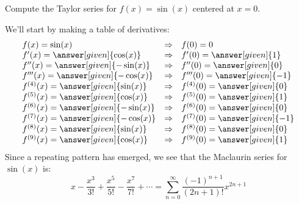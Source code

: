 \documentclass{ximera}
\begin{document}
\begin{example}
  Compute the Taylor series for $f(x) = \sin(x)$ centered at $x=0$.
  \begin{explanation}
    We'll start by making a table of derivatives:
    \[
    \begin{array}{lcl}
      f(x) = \sin(x) & \Rightarrow &f(0) = 0\\
      f'(x) = \answer[given]{\cos(x)} & \Rightarrow & f'(0) = \answer[given]{1}\\
      f''(x) = \answer[given]{-\sin(x)} &\Rightarrow &f''(0) = \answer[given]{0}\\
      f'''(x) = \answer[given]{-\cos(x)} &\Rightarrow &f'''(0) = \answer[given]{-1}\\
      f^{(4)}(x) = \answer[given]{\sin(x)} &\Rightarrow &f^{(4)}(0) = \answer[given]{0}\\
      f^{(5)}(x) = \answer[given]{\cos(x)} &\Rightarrow &f^{(5)}(0) = \answer[given]{1}\\
      f^{(6)}(x) = \answer[given]{-\sin(x)} &\Rightarrow &f^{(6)}(0) =\answer[given]{0}\\
      f^{(7)}(x) = \answer[given]{-\cos(x)} &\Rightarrow &f^{(7)}(0) = \answer[given]{-1}\\
      f^{(8)}(x) = \answer[given]{\sin(x)} &\Rightarrow &f^{(8)}(0) = \answer[given]{0}\\
      f^{(9)}(x) = \answer[given]{\cos(x)} &\Rightarrow &f^{(9)}(0) = \answer[given]{1}\\
    \end{array}
    \]
    Since a repeating pattern has emerged, we see that the Maclaurin
    series for $\sin(x)$ is:
    \[
    x-\frac{x^3}{3!}+\frac{x^5}{5!}-\frac{x^7}{7!}+\cdots = \sum_{n=0}^\infty \frac{(-1)^{n+1}}{(2n+1)!} x^{2n+1}
    \]
  \end{explanation}
\end{example}
\end{document}
